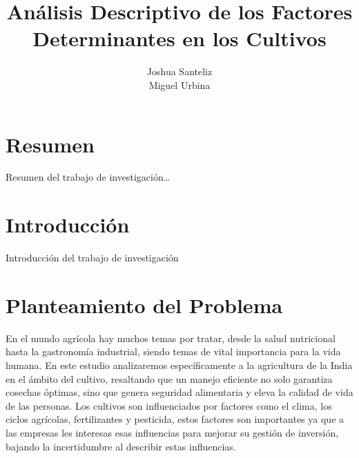 \documentclass[oneside,11pt]{Latex/Classes/PhDthesisPSnPDF}
\title{Análisis Descriptivo de los Factores Determinantes en los
Cultivos}
\author{Joshua Santeliz \\ Miguel Urbina \\ }
\begin{document}
\maketitle

\frontmatter


\setcounter{secnumdepth}{3}
\setcounter{tocdepth}{3}

\tableofcontents



\cleardoublepage

  \cleardoublepage       %
  \chapter*{Resumen}     %
  
  Resumen del trabajo de
investigación\ldots{}             %
  
  \cleardoublepage

\mainmatter
\def\baselinestretch{1.5}

\chapter*{Introducción}

Introducción del trabajo de investigación

\chapter{Planteamiento del Problema}

En el mundo agrícola hay muchos temas por tratar, desde la salud
nutricional hasta la gastronomía industrial, siendo temas de vital
importancia para la vida humana. En este estudio analizaremos
específicamente a la agricultura de la India en el ámbito del cultivo,
resaltando que un manejo eficiente no solo garantiza cosechas óptimas,
sino que genera seguridad alimentaria y eleva la calidad de vida de las
personas. Los cultivos son influenciados por factores como el clima, los
ciclos agrícolas, fertilizantes y pesticida, estos factores son
importantes ya que a las empresas les interesas esas influencias para
mejorar su gestión de inversión, bajando la incertidumbre al describir
estas influencias.\\
\end{document}
